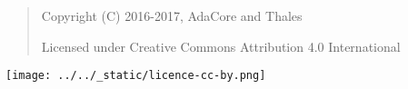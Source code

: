 \bigskip
\begin{quote}
   Copyright (C) 2016-2017, AdaCore and Thales

   Licensed under Creative Commons Attribution 4.0 International
\end{quote}

\texttt{[image: ../../\_static/licence-cc-by.png]}
\bigskip
